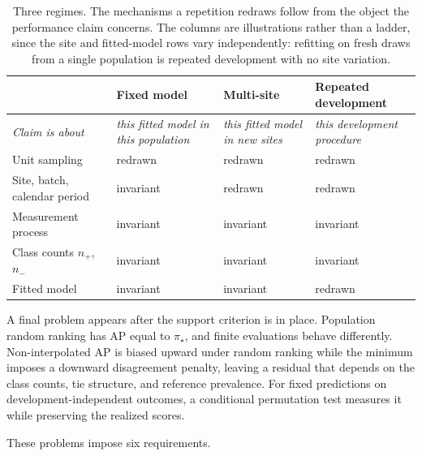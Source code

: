 \documentclass[11pt]{article}
\theoremstyle{remark}
\begin{document}
\begin{table}[ht]
\centering
\caption{Three regimes. The mechanisms a repetition redraws follow from the object the performance claim concerns. The columns are illustrations rather than a ladder, since the site and fitted-model rows vary independently: refitting on fresh draws from a single population is repeated development with no site variation.}
\label{tab:regimes}
\begin{tabularx}{\textwidth}{@{}l>{\centering\arraybackslash}X>{\centering\arraybackslash}X>{\centering\arraybackslash}X@{}}
\toprule
& Fixed model & Multi-site & Repeated development \\
\midrule
\emph{Claim is about} & \emph{this fitted model in this population} & \emph{this fitted model in new sites} & \emph{this development procedure} \\
\midrule
Unit sampling & redrawn & redrawn & redrawn \\
Site, batch, calendar period & invariant & redrawn & redrawn \\
Measurement process & invariant & invariant & invariant \\
Class counts $n_+$, $n_-$ & invariant & invariant & invariant \\
Fitted model & invariant & invariant & redrawn \\
\bottomrule
\end{tabularx}
\end{table}

A final problem appears after the support criterion is in place. Population random ranking has AP equal to $\pi_\star$, and finite evaluations behave differently. Non-interpolated AP is biased upward under random ranking while the minimum imposes a downward disagreement penalty, leaving a residual that depends on the class counts, tie structure, and reference prevalence. For fixed predictions on development-independent outcomes, a conditional permutation test measures it while preserving the realized scores.

These problems impose six requirements.
\end{document}
